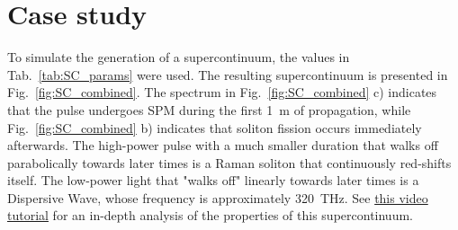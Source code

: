 \begin{table}[]
\end{table}
\section{Case study}
To simulate the generation of a supercontinuum, the values in Tab.~\ref{tab:SC_params} were used. The resulting supercontinuum is presented in Fig.~\ref{fig:SC_combined}. The spectrum in Fig.~\ref{fig:SC_combined} c) indicates that the pulse undergoes SPM during the first 1~m of propagation, while Fig.~\ref{fig:SC_combined} b) indicates that soliton fission occurs immediately afterwards. The high-power pulse with a much smaller duration that walks off parabolically towards later times is a Raman soliton that continuously red-shifts itself. The low-power light that "walks off" linearly towards later times is a Dispersive Wave, whose frequency is approximately 320~THz. See \href{https://youtu.be/-GDsMDpC3oA}{this video tutorial} for an in-depth analysis of the properties of this supercontinuum.

